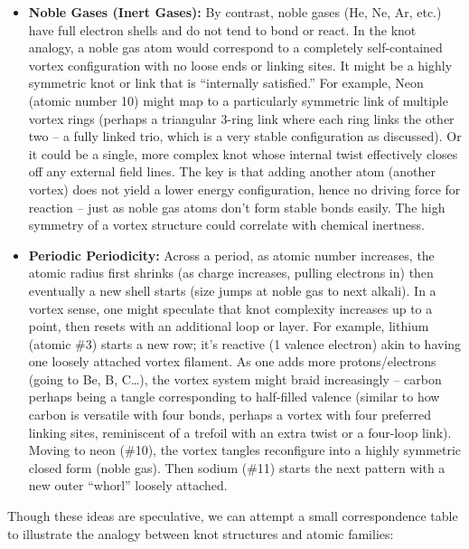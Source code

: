\begin{itemize}
    \item \textbf{Noble Gases (Inert Gases):} By contrast, noble gases (He, Ne, Ar, etc.) have full electron shells and do not tend to bond or react. In the knot analogy, a noble gas atom would correspond to a completely self-contained vortex configuration with no loose ends or linking sites. It might be a highly symmetric knot or link that is ``internally satisfied.'' For example, Neon (atomic number 10) might map to a particularly symmetric link of multiple vortex rings (perhaps a triangular 3-ring link where each ring links the other two -- a fully linked trio, which is a very stable configuration as discussed). Or it could be a single, more complex knot whose internal twist effectively closes off any external field lines. The key is that adding another atom (another vortex) does not yield a lower energy configuration, hence no driving force for reaction -- just as noble gas atoms don't form stable bonds easily. The high symmetry of a vortex structure could correlate with chemical inertness.

    \item \textbf{Periodic Periodicity:} Across a period, as atomic number increases, the atomic radius first shrinks (as charge increases, pulling electrons in) then eventually a new shell starts (size jumps at noble gas to next alkali). In a vortex sense, one might speculate that knot complexity increases up to a point, then resets with an additional loop or layer. For example, lithium (atomic \#3) starts a new row; it's reactive (1 valence electron) akin to having one loosely attached vortex filament. As one adds more protons/electrons (going to Be, B, C\ldots), the vortex system might braid increasingly -- carbon perhaps being a tangle corresponding to half-filled valence (similar to how carbon is versatile with four bonds, perhaps a vortex with four preferred linking sites, reminiscent of a trefoil with an extra twist or a four-loop link). Moving to neon (\#10), the vortex tangles reconfigure into a highly symmetric closed form (noble gas). Then sodium (\#11) starts the next pattern with a new outer ``whorl'' loosely attached.
\end{itemize}

Though these ideas are speculative, we can attempt a small correspondence table to illustrate the analogy between knot structures and atomic families:

